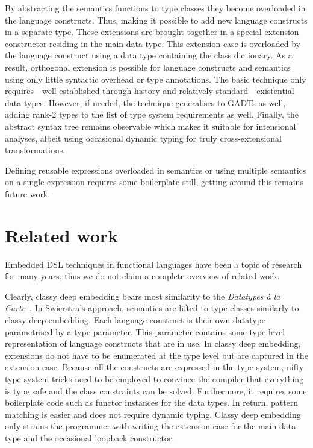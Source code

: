 \documentclass[runningheads]{llncs}
\begin{document}
By abstracting the semantics functions to type classes they become overloaded in the language constructs.
Thus, making it possible to add new language constructs in a separate type.
These extensions are brought together in a special extension constructor residing in the main data type.
This extension case is overloaded by the language construct using a data type containing the class dictionary.
As a result, orthogonal extension is possible for language constructs and semantics using only little syntactic overhead or type annotations.
The basic technique only requires---well established through history and relatively standard---existential data types.
However, if needed, the technique generalises to GADTs as well, adding rank-2 types to the list of type system requirements as well.
Finally, the abstract syntax tree remains observable which makes it suitable for intensional analyses, albeit using occasional dynamic typing for truly cross-extensional transformations.

Defining reusable expressions overloaded in semantics or using multiple semantics on a single expression requires some boilerplate still, getting around this remains future work.

\section{Related work}%
\label{sec:related}

Embedded DSL techniques in functional languages have been a topic of research for many years, thus we do not claim a complete overview of related work.

Clearly, classy deep embedding bears most similarity to the \emph{Datatypes \`a la Carte}~\cite{swierstra_data_2008}.
In Swierstra's approach, semantics are lifted to type classes similarly to classy deep embedding.
Each language construct is their own datatype parametrised by a type parameter.
This parameter contains some type level representation of language constructs that are in use.
In classy deep embedding, extensions do not have to be enumerated at the type level but are captured in the extension case.
Because all the constructs are expressed in the type system, nifty type system tricks need to be employed to convince the compiler that everything is type safe and the class constraints can be solved.
Furthermore, it requires some boilerplate code such as functor instances for the data types.
In return, pattern matching is easier and does not require dynamic typing.
Classy deep embedding only strains the programmer with writing the extension case for the main data type and the occasional loopback constructor.
\end{document}
